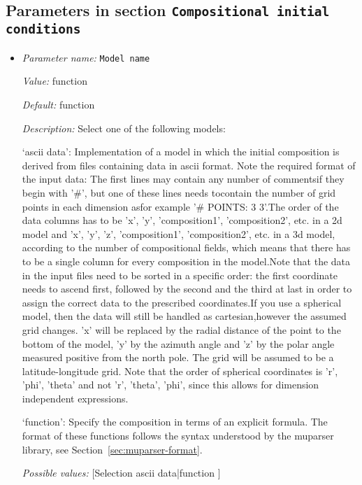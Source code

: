 \subsection{Parameters in section \tt Compositional initial conditions}
\label{parameters:Compositional_20initial_20conditions}

\begin{itemize}
\item {\it Parameter name:} {\tt Model name}
\label{parameters:Compositional initial conditions/Model name}


{\it Value:} function


{\it Default:} function


{\it Description:} Select one of the following models:

`ascii data': Implementation of a model in which the initial composition is derived from files containing data in ascii format. Note the required format of the input data: The first lines may contain any number of commentsif they begin with '#', but one of these lines needs tocontain the number of grid points in each dimension asfor example '# POINTS: 3 3'.The order of the data columns has to be 'x', 'y', 'composition1', 'composition2', etc. in a 2d model and 'x', 'y', 'z', 'composition1', 'composition2', etc. in a 3d model, according to the number of compositional fields, which means that there has to be a single column for every composition in the model.Note that the data in the input files need to be sorted in a specific order: the first coordinate needs to ascend first, followed by the second and the third at last in order to assign the correct data to the prescribed coordinates.If you use a spherical model, then the data will still be handled as cartesian,however the assumed grid changes. 'x' will be replaced by the radial distance of the point to the bottom of the model, 'y' by the azimuth angle and 'z' by the polar angle measured positive from the north pole. The grid will be assumed to be a latitude-longitude grid. Note that the order of spherical coordinates is 'r', 'phi', 'theta' and not 'r', 'theta', 'phi', since this allows for dimension independent expressions. 

`function': Specify the composition in terms of an explicit formula. The format of these functions follows the syntax understood by the muparser library, see Section~\ref{sec:muparser-format}.


{\it Possible values:} [Selection ascii data|function ]
\end{itemize}



